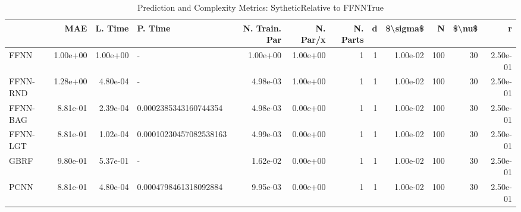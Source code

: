 \begin{table}
\centering
\caption{Prediction and Complexity Metrics: SytheticRelative to FFNNTrue}
\label{tab__Sythetic__Fix_Neurons_QTrue}
\begin{tabular}{lrrlrrrrrrrr}
\toprule
{} &      MAE &  L. Time &                 P. Time &  N. Train. Par &  N. Par/x &  N. Parts &  d &  \$\textbackslash sigma\$ &    N &  \$\textbackslash nu\$ &        r \\
\midrule
FFNN     & 1.00e+00 & 1.00e+00 &                       - &       1.00e+00 &  1.00e+00 &         1 &  1 &  1.00e-02 &  100 &     30 & 2.50e-01 \\
FFNN-RND & 1.28e+00 & 4.80e-04 &                       - &       4.98e-03 &  1.00e+00 &         1 &  1 &  1.00e-02 &  100 &     30 & 2.50e-01 \\
FFNN-BAG & 8.81e-01 & 2.39e-04 &   0.0002385343160744354 &       4.98e-03 &  0.00e+00 &         1 &  1 &  1.00e-02 &  100 &     30 & 2.50e-01 \\
FFNN-LGT & 8.81e-01 & 1.02e-04 &  0.00010230457082538163 &       4.99e-03 &  0.00e+00 &         1 &  1 &  1.00e-02 &  100 &     30 & 2.50e-01 \\
GBRF     & 9.80e-01 & 5.37e-01 &                       - &       1.62e-02 &  0.00e+00 &         1 &  1 &  1.00e-02 &  100 &     30 & 2.50e-01 \\
PCNN     & 8.81e-01 & 4.80e-04 &   0.0004798461318092884 &       9.95e-03 &  0.00e+00 &         1 &  1 &  1.00e-02 &  100 &     30 & 2.50e-01 \\
\bottomrule
\end{tabular}
\end{table}
